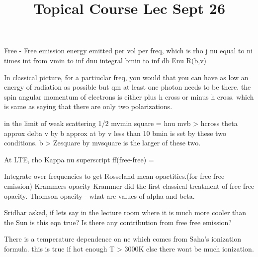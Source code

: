 \documentclass{../template/texnote}
\title{Topical Course Lec Sept 26}
\begin{document}
    \maketitle {}
Free - Free emission
energy emitted per vol per freq, which is rho j nu
equal to ni times int from vmin to inf dnu integral bmin to inf db Enu R(b,v)

In classical picture, for a partiuclar freq, you would that you can have as low an energy of radiation as possible but qm at least one photon needs to be there.
the spin angular momentum of electrons is either plus h cross or minus h cross.
which is same as saying that there are only two polarizations.

in the limit of weak scattering
1/2 mvmin square = hnu
mvb > hcross
theta approx delta v by b approx at by v less than 10
bmin is set by these two conditions.
b > Zesquare by mvsquare
is the larger of these two.


At LTE,
rho Kappa nu superscript ff(free-free) = 

Integrate over frequencies to get Rosseland mean opactities.(for free free emission)
Krammers opacity
Krammer did the first classical treatment of free free opacity.
Thomson opacity - what are values of alpha and beta.

Sridhar asked, 
if lets say  in the lecture room where it is much more cooler than the Sun is this eqn true? 
Is there any contribution from free free emission?

There is a temperature dependence on ne which comes from Saha's ionization formula.
this is true if hot enough T > 3000K
else there wont be much ionization.

    \printbibliography
\end{document}
